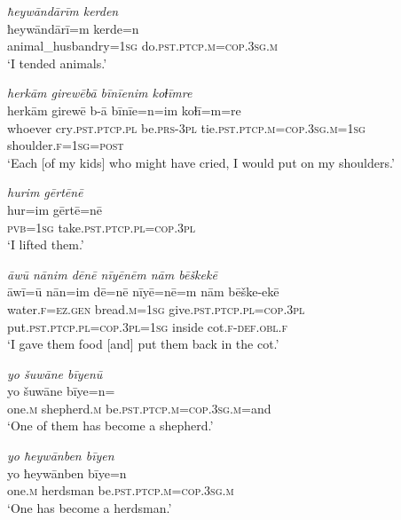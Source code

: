 \ea \label{ŽE.63}
\textit{ħeywāndārīm kerden} \\ 
\gll ħeywāndārī=m kerde=n \\ 
 animal\_husbandry\textsc{=\textsc{1sg}} do\textsc{.pst}\textsc{.ptcp}\textsc{.m}\textsc{=cop}\textsc{.3sg}\textsc{.m} \\ 
\glt `I tended animals.'
\z 
 
\ea \label{ŽE.64}
\textit{herkām girewēbā bīnīenim koɫīmre} \\ 
\gll herkām girewē b-ā bīnīe=n=im koɫī=m=re \\ 
 whoever cry\textsc{.pst}\textsc{.ptcp}\textsc{.pl} be\textsc{.prs}\textsc{-3pl} tie\textsc{.pst}\textsc{.ptcp}\textsc{.m}\textsc{=cop}\textsc{.3sg}\textsc{.m}\textsc{=\textsc{1sg}} shoulder\textsc{.f}\textsc{=\textsc{1sg}}\textsc{=\textsc{post}} \\ 
\glt `Each [of my kids] who might have cried, I would put on my shoulders.'
\z 
 
\ea \label{ŽE.66}
\textit{hurim gērtēnē} \\ 
\gll hur=im gērtē=nē \\ 
 \textsc{pvb}\textsc{=\textsc{1sg}} take\textsc{.pst}\textsc{.ptcp}\textsc{.pl}\textsc{=cop}\textsc{.3pl} \\ 
\glt `I lifted them.'
\z 
 
\ea \label{ŽE.67}
\textit{āwū nānim dēnē nīyēnēm nām bēškekē} \\ 
\gll āwī=ū nān=im dē=nē nīyē=nē=m nām bēške-ekē \\ 
 water\textsc{.f}\textsc{\textsc{=ez.gen}} bread\textsc{.m}\textsc{=\textsc{1sg}} give\textsc{.pst}\textsc{.ptcp}\textsc{.pl}\textsc{=cop}\textsc{.3pl} put\textsc{.pst}\textsc{.ptcp}\textsc{.pl}\textsc{=cop}\textsc{.3pl}\textsc{=\textsc{1sg}} inside cot\textsc{.f}\textsc{-def}\textsc{.obl}\textsc{.f} \\ 
\glt `I gave them food [and] put them back in the cot.'
\z 
 
\ea \label{ŽE.69}
\textit{yo šuwāne bīyenū} \\ 
\gll yo šuwāne bīye=n=\\ 
 one\textsc{.m} shepherd\textsc{.m} be\textsc{.pst}\textsc{.ptcp}\textsc{.m}\textsc{=cop}\textsc{.3sg}\textsc{.m}=and \\ 
\glt `One of them has become a shepherd.'
\z 
 
\ea \label{ŽE.70}
\textit{yo ħeywānben bīyen} \\ 
\gll yo ħeywānben bīye=n \\ 
 one\textsc{.m} herdsman be\textsc{.pst}\textsc{.ptcp}\textsc{.m}\textsc{=cop}\textsc{.3sg}\textsc{.m} \\ 
\glt `One has become a herdsman.'
\z 
 
